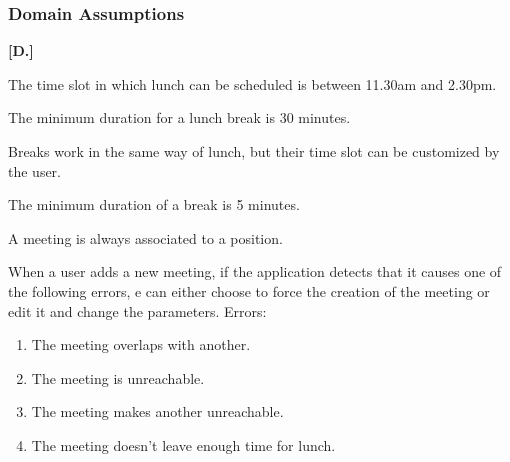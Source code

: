 \subsubsection{Domain Assumptions}
\begin{list}
{\bfseries{}[D.]~}
{
}
\item
The time slot in which lunch can be scheduled is between 11.30am and 2.30pm.
\item
The minimum duration for a lunch break is 30 minutes.
\item
Breaks work in the same way of lunch, but their time slot can be customized by the user.
\item
The minimum duration of a break is 5 minutes.
\item
A meeting is always associated to a position.
\item
When a user adds a new meeting, if the application detects that it causes one of the following errors, e can either choose to force the creation of the meeting or edit it and change the parameters.
Errors:
\begin{enumerate}
\item
The meeting overlaps with another.
\item
The meeting is unreachable.
\item
The meeting makes another unreachable.
\item
The meeting doesn't leave enough time for lunch.
\end{enumerate}


\end{list}

